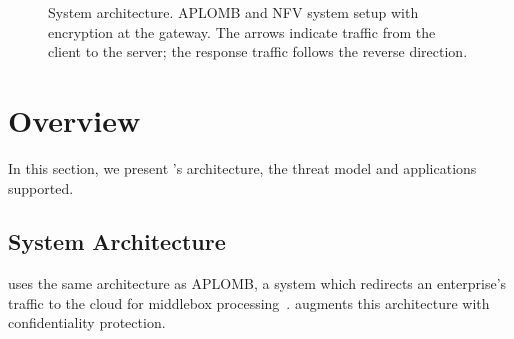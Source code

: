 
\begin{figure}[t!]
\centering
{}
%
\hfill  
{}
     
\caption{System architecture. APLOMB and NFV system setup with \sys encryption  at the gateway. The arrows indicate traffic from the client to the server; the response traffic follows the reverse direction. \label{fig:sys-overview}}
\end{figure}




     
\section{Overview}\label{sec:overview}








In this section, we present \sys's architecture, the threat model and applications supported.


\subsection{System Architecture}

\sys uses the same  architecture as APLOMB, a system which redirects an enterprise's traffic to the cloud for middlebox processing~\cite{aplomb}. \sys augments this architecture with confidentiality protection.


